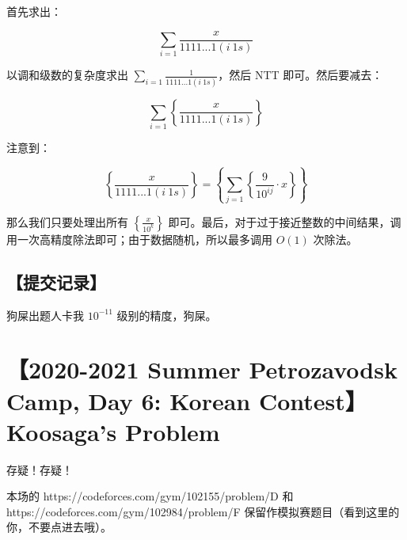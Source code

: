 \documentclass[UTF8,12pt,a4paper]{ctexart}
\begin{document}
	首先求出：
	
	$$\sum_{i=1}\frac x{1111...1(i\ 1s)}$$
	
	以调和级数的复杂度求出 $\sum_{i=1}\frac 1{1111...1(i\ 1s)}$，然后 NTT 即可。然后要减去：
	
	$$
	\sum_{i=1}\left\{\frac x{1111...1(i\ 1s)}\right\}
	$$
	
	注意到：
	
	$$
	\left\{\frac x{1111...1(i\ 1s)}\right\}=\left\{\sum_{j=1} \left\{\frac 9{10^{ij}}\cdot x\right\}\right\}
	$$
	
	那么我们只要处理出所有 $\left\{\frac x{10^k}\right\}$ 即可。最后，对于过于接近整数的中间结果，调用一次高精度除法即可；由于数据随机，所以最多调用 $O(1)$ 次除法。
	
	
	\subsection*{【提交记录】}
	
	狗屎出题人卡我 $10^{-11}$ 级别的精度，狗屎。
	
	
	\section*{【2020-2021 Summer Petrozavodsk Camp, Day 6: Korean Contest】Koosaga's Problem}
	
	存疑！存疑！
	
	本场的 https://codeforces.com/gym/102155/problem/D 和 https://codeforces.com/gym/102984/problem/F 保留作模拟赛题目（看到这里的你，不要点进去哦）。
	
\end{document}

